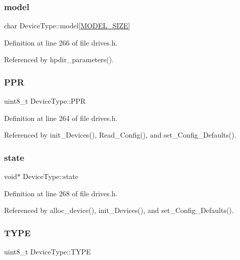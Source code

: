 \subsubsection{\texorpdfstring{model}{model}}
{\footnotesize\ttfamily char Device\+Type\+::model\mbox{[}\hyperlink{drives_8h_a3f11d81c1e6d925611a9bdd5115064a0}{M\+O\+D\+E\+L\+\_\+\+S\+I\+ZE}\mbox{]}}



Definition at line 266 of file drives.\+h.



Referenced by hpdir\+\_\+parameters().

\mbox{\label{structDeviceType_ae0e59c6c17582ff80bdab3f2010e8d57}} 
\subsubsection{\texorpdfstring{P\+PR}{PPR}}
{\footnotesize\ttfamily uint8\+\_\+t Device\+Type\+::\+P\+PR}



Definition at line 264 of file drives.\+h.



Referenced by init\+\_\+\+Devices(), Read\+\_\+\+Config(), and set\+\_\+\+Config\+\_\+\+Defaults().

\mbox{\label{structDeviceType_ad0fc43d63606bab6c259047e36512e08}} 
\subsubsection{\texorpdfstring{state}{state}}
{\footnotesize\ttfamily void$\ast$ Device\+Type\+::state}



Definition at line 268 of file drives.\+h.



Referenced by alloc\+\_\+device(), init\+\_\+\+Devices(), and set\+\_\+\+Config\+\_\+\+Defaults().

\mbox{\label{structDeviceType_acee5219162b6f47a9423b2086d127ede}} 
\subsubsection{\texorpdfstring{T\+Y\+PE}{TYPE}}
{\footnotesize\ttfamily uint8\+\_\+t Device\+Type\+::\+T\+Y\+PE}



